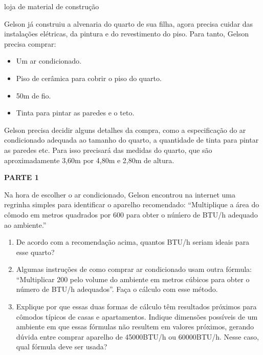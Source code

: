 \label{\detokenize{GE504-2::doc}}\label{\detokenize{GE504-2:explorando-dimensao}}
\begin{task}{loja de material de construção}



Gelson já construiu a alvenaria do quarto de sua filha, agora precisa cuidar das instalações elétricas, da pintura e do revestimento do piso. Para tanto, Gelson precisa comprar:
\begin{itemize}
\item {} 
Um ar condicionado.

\item {} 
Piso de cerâmica para cobrir o piso do quarto.

\item {} 
50m de fio.

\item {} 
Tinta para pintar as paredes e o teto.

\end{itemize}

Gelson precisa decidir alguns detalhes da compra, como a especificação do ar condicionado adequada ao tamanho do quarto, a quantidade de tinta para pintar as paredes etc. Para isso precisará das medidas do quarto, que são aproximadamente 3,60m por 4,80m e 2,80m de altura.

\textbf{PARTE 1}

Na hora de escolher o ar condicionado, Gelson encontrou na internet uma regrinha simples para identificar o aparelho recomendado: “Multiplique a área do cômodo em metros quadrados por 600 para obter o núḿero de BTU/h adequado ao ambiente.”
\begin{enumerate}
\item {} 
De acordo com a recomendação acima, quantos BTU/h seriam ideais para esse quarto?

\item {} 
Algumas instruções de como comprar ar condicionado usam outra fórmula: “Multiplicar 200 pelo volume do ambiente em metros cúbicos para obter o número de BTU/h adequados”. Faça o cálculo com esse método.

\item {} 
Explique por que essas duas formas de cálculo têm resultados próximos para cômodos típicos de casas e apartamentos. Indique dimensões possíveis de um ambiente em que essas fórmulas não resultem em valores próximos, gerando dúvida entre comprar aparelho de 45000BTU/h ou 60000BTU/h. Nesse caso, qual fórmula deve ser usada?


\end{enumerate}
\end{task}

